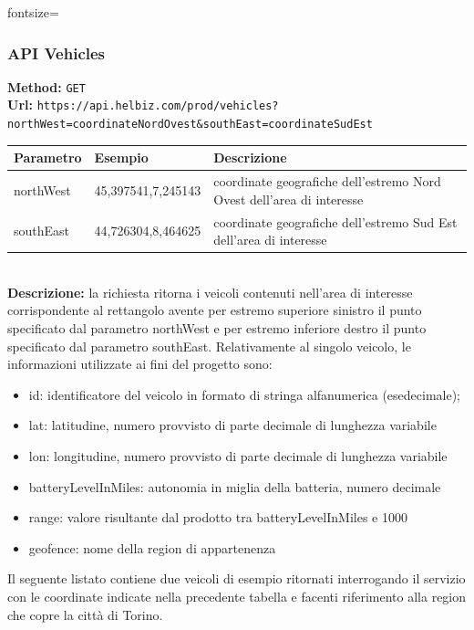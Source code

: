 \inputminted[bgcolor=lightgray]{json}{region.json}{fontsize=\footnotesize}

\subsubsection{API Vehicles}

\textbf{Method:} \texttt{GET} \\
\textbf{Url:} \texttt{https://api.helbiz.com/prod/vehicles?northWest=coordinateNordOvest\&southEast=coordinateSudEst} \\

\begin{tabular}{lll}
\toprule
\textbf{Parametro} & \textbf{Esempio} & \textbf{Descrizione} \\
\midrule
northWest & 45,397541,7,245143 & coordinate geografiche dell'estremo Nord Ovest dell'area di interesse \\
southEast & 44,726304,8,464625 & coordinate geografiche dell'estremo Sud Est dell'area di interesse \\
\bottomrule
\end{tabular} \\

\noindent\textbf{Descrizione:} la richiesta ritorna i veicoli contenuti nell'area di interesse 
corrispondente al rettangolo avente per estremo superiore sinistro il punto specificato dal
parametro northWest e per estremo inferiore destro il punto specificato dal parametro southEast.
Relativamente al singolo veicolo, le informazioni utilizzate ai fini del progetto sono:
\begin{itemize}
\item id: identificatore del veicolo in formato di stringa alfanumerica (esedecimale);
\item lat: latitudine, numero provvisto di parte decimale di lunghezza variabile 
\item lon: longitudine, numero provvisto di parte decimale di lunghezza variabile
\item batteryLevelInMiles: autonomia in miglia della batteria, numero decimale 
\item range: valore risultante dal prodotto tra batteryLevelInMiles e 1000
\item geofence: nome della region di appartenenza
\end{itemize}
Il seguente listato contiene due veicoli di esempio ritornati interrogando il servizio
con le coordinate indicate nella precedente tabella e facenti riferimento alla region
che copre la città di Torino.

